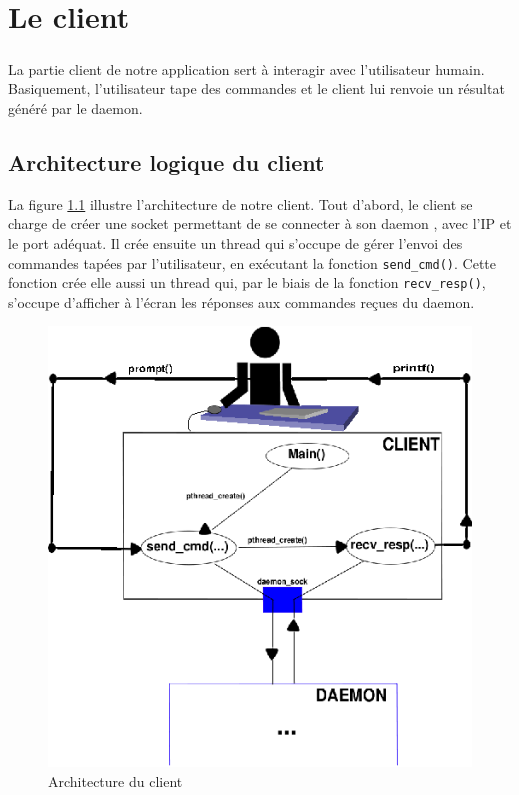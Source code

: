 
\chapter{Le client}

	\paragraph{}La partie client de notre application sert à interagir avec 
l'utilisateur humain. Basiquement, l'utilisateur tape des commandes et le 
client lui renvoie un résultat généré par le daemon.
	
	\section{Architecture logique du client}

La figure \ref{client} illustre l'architecture de notre client. Tout d'abord, 
le client se charge de créer une socket permettant de se connecter à son daemon
, avec l'IP et le port adéquat. Il crée ensuite un thread qui s'occupe de gérer
 l'envoi des commandes tapées par l'utilisateur, en exécutant la fonction 
\verb"send_cmd()". Cette fonction crée elle aussi un thread qui, par le biais 
de la fonction \verb"recv_resp()", s'occupe d'afficher à l'écran les réponses 
aux commandes reçues du daemon.

\begin{center}
\begin{figure}[H]
    \centering
    \includegraphics[scale=0.95]{client/archi_client.eps}
    \caption{Architecture du client}
    \label{client}
\end{figure}
\end{center}
	
